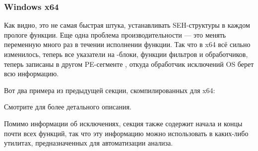 \subsubsection{Windows x64}

\label{SEH_win64}
Как видно, это не самая быстрая штука, устанавливать SEH-структуры в каждом прологе функции.
Еще одна проблема производительности --- это менять переменную 
 много раз в течении исполнении функции.
Так что в x64 всё сильно изменилось, теперь все указатели на -блоки, функции фильтров и обработчиков,
теперь записаны в другом PE-сегменте
 , откуда обработчик исключений \ac{OS} берет всю информацию.

Вот два примера из предыдущей секции, скомпилированных для x64:





Смотрите \IgorSkochinsky для более детального описания.

Помимо информации об исключениях, секция  
также содержит начала и концы почти всех функций, так что эту информацию можно использовать в каких-либо
утилитах, предназначенных для автоматизации анализа.


